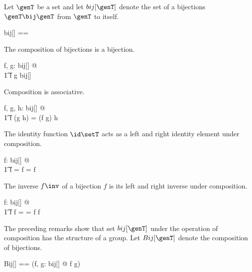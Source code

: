 \documentclass{amsart}
\begin{document}
Let $\genT$ be a set and let $bij[\genT]$ denote the set of a bijections $\genT \bij \genT$ from $\genT$ to itself.
\begin{zed}
	bij[\genT] == \genT \bij \genT
\end{zed}

\begin{remark}
The composition of bijections is a bijection.

\begin{zed}
	\forall f, g: bij[\setT] @ \\
	\t1	f \circ g \in bij[\setT]
\end{zed}

\end{remark}

\begin{remark}
Composition is associative.

\begin{zed}
	\forall f, g, h: bij[\setT] @ \\
	\t1	f \circ (g \circ h) = (f \circ g) \circ h
\end{zed}

\end{remark}

\begin{remark}
The identity function $\id \setT$ acts as a left and right identity element under composition.

\begin{zed}
	\forall f: bij[\setT] @ \\
	\t1	 \id \setT \circ f = f = f \circ \id \setT
\end{zed}

\end{remark}

\begin{remark}
The inverse $f \inv$ of a bijection $f$ is its left and right inverse under composition.

\begin{zed}
	\forall f: bij[\setT] @ \\
	\t1	f \circ f \inv = \id \setT = f \inv \circ f
\end{zed}

\end{remark}

The preceding remarks show that set $bij[\genT]$ under the operation of composition has the structure of a group.
Let $Bij[\genT]$ denote the composition of bijections.
\begin{zed}
	Bij[\genT] == (\lambda f, g: bij[\genT] @ f \circ g)
\end{zed}
\end{document}
